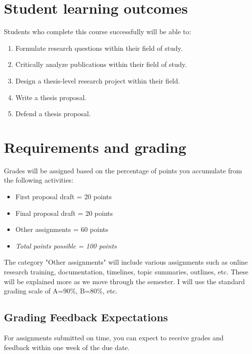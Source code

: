 \documentclass[10pt]{article}
\begin{document}
\section*{Student learning outcomes}
\label{sec:orgd9dbfc4}

Students who complete this course successfully will be able to:

\begin{enumerate}
\item Formulate research questions within their field of study.
\item Critically analyze publications within their field of study.
\item Design a thesis-level research project within their field.
\item Write a thesis proposal.
\item Defend a thesis proposal.
\end{enumerate}


\section*{Requirements and grading}
\label{sec:org70cdfa0}

Grades will be assigned based on the percentage of points you accumulate from the following activities:

\begin{itemize}
\item First proposal draft = 20 points
\item Final proposal draft = 20 points
\item Other assignments = 60 points
\item \emph{Total points possible = 100 points}
\end{itemize}

The category "Other assignments" will include various assignments such as online research training, documentation, timelines, topic summaries, outlines, etc.  These will be explained more as we move through the semester. I will use the standard grading scale of A=90\%, B=80\%, etc.

\subsection*{Grading Feedback Expectations}
\label{sec:org8c51d8c}

For assignments submitted on time, you can expect to receive grades and feedback within one week of the due date.
\end{document}
